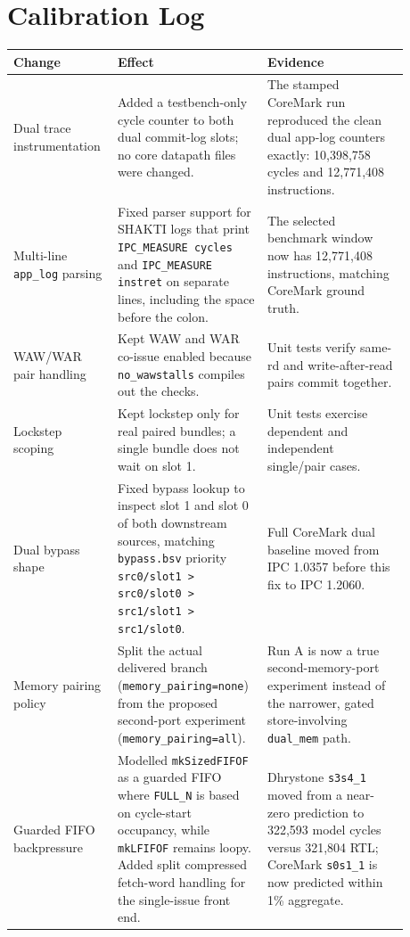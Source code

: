 \documentclass[10pt]{article}
\begin{document}
\section*{Calibration Log}

\begin{longtable}{@{}p{0.23\linewidth}p{0.31\linewidth}p{0.34\linewidth}@{}}
\toprule
Change & Effect & Evidence \\
\midrule
\endhead
Dual trace instrumentation & Added a testbench-only cycle counter to both
dual commit-log slots; no core datapath files were changed. & The stamped
CoreMark run reproduced the clean dual app-log counters exactly:
10,398,758 cycles and 12,771,408
instructions. \\
Multi-line \texttt{app\_log} parsing & Fixed parser support for SHAKTI logs
that print \texttt{IPC\_MEASURE cycles} and \texttt{IPC\_MEASURE instret}
on separate lines, including the space before the colon. & The selected
benchmark window now has 12,771,408
instructions, matching CoreMark ground truth. \\
WAW/WAR pair handling & Kept WAW and WAR co-issue enabled because
\texttt{no\_wawstalls} compiles out the checks. & Unit tests verify same-rd
and write-after-read pairs commit together. \\
Lockstep scoping & Kept lockstep only for real paired bundles; a single bundle
does not wait on slot 1. & Unit tests exercise dependent and independent
single/pair cases. \\
Dual bypass shape & Fixed bypass lookup to inspect slot 1 and slot 0 of both
downstream sources, matching \texttt{bypass.bsv} priority
\texttt{src0/slot1 > src0/slot0 > src1/slot1 > src1/slot0}. & Full CoreMark
dual baseline moved from IPC 1.0357 before this fix to IPC 1.2060. \\
Memory pairing policy & Split the actual delivered branch
(\texttt{memory\_pairing=none}) from the proposed second-port experiment
(\texttt{memory\_pairing=all}). & Run A is now a true second-memory-port
experiment instead of the narrower, gated store-involving \texttt{dual\_mem}
path. \\
Guarded FIFO backpressure & Modelled \texttt{mkSizedFIFOF} as a guarded FIFO
where \texttt{FULL\_N} is based on cycle-start occupancy, while \texttt{mkLFIFOF}
remains loopy. Added split compressed fetch-word handling for the single-issue
front end. & Dhrystone \texttt{s3s4\_1} moved from a near-zero prediction to
322,593 model cycles versus
321,804 RTL; CoreMark
\texttt{s0s1\_1} is now predicted within 1\% aggregate. \\

\end{longtable}
\end{document}
